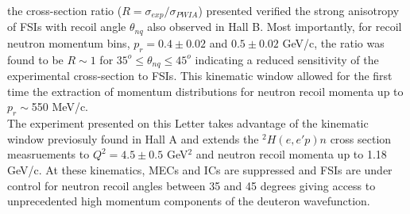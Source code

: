 the cross-section ratio ($R = \sigma_{exp}/\sigma_{PWIA}$) presented verified the strong anisotropy of FSIs with recoil angle $\theta_{nq}$ also observed in Hall B\cite{PhysRevLett.98.262502}. Most importantly, for recoil
neutron momentum bins, $p_{r}=0.4\pm0.02$ and $0.5\pm0.02$ GeV/c, the ratio was found to be $R\sim1$ for $35^{o}\leq \theta_{nq}\leq45^{o}$ indicating a reduced sensitivity of the experimental
cross-section to FSIs. This kinematic window allowed for the first time the extraction of momentum distributions for neutron recoil momenta up to $p_{r}\sim$550 MeV/c. \\
\indent The experiment presented on this Letter takes advantage of the kinematic window previosuly found in Hall A\cite{PhysRevLett.107.262501} and extends the $^{2}H(e,e'p)n$ cross section measruements
to $Q^{2}=4.5\pm0.5$ GeV$^{2}$ and neutron recoil momenta up to 1.18 GeV/c. At these kinematics, MECs and ICs are suppressed and FSIs are under control for neutron recoil angles between 35 and 45 degrees
giving access to unprecedented high momentum components of the deuteron wavefunction. \\
